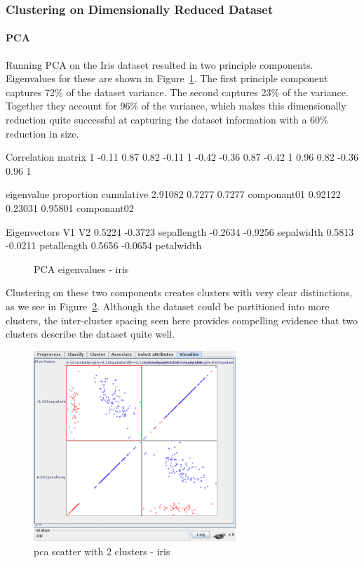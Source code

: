 \documentclass{sig-alternate}
\begin{document}
\subsubsection{Clustering on Dimensionally Reduced Dataset}


\paragraph{PCA}
Running PCA on the Iris dataset resulted in two principle components. Eigenvalues for these are shown in Figure~\ref{pca-iris}. The first principle component captures 72\% of the dataset variance. The second captures 23\% of the variance. Together they account for 96\% of the variance, which makes this dimensionally reduction quite successful at capturing the dataset information with a 60\% reduction in size.


\begin{verbbox}
Correlation matrix
  1     -0.11   0.87   0.82 
 -0.11   1     -0.42  -0.36 
  0.87  -0.42   1      0.96 
  0.82  -0.36   0.96   1    


eigenvalue  proportion  cumulative
2.91082     0.7277      0.7277    componant01
0.92122     0.23031     0.95801   componant02

Eigenvectors
 V1  V2 
 0.5224 -0.3723 sepallength
-0.2634 -0.9256 sepalwidth
 0.5813 -0.0211 petallength
 0.5656 -0.0654 petalwidth
\end{verbbox}

\begin{figure}[!htbp]
    \centering
    \theverbbox
    \caption{PCA eigenvalues - iris\label{pca-iris}}
\end{figure}


Clustering on these two components creates clusters with very clear distinctions, as we see in Figure~\ref{pca-cluster-scatter-iris}. Although the dataset could be partitioned into more clusters, the inter-cluster spacing seen here provides compelling evidence that two clusters describe the dataset quite well.


\begin{figure}[!htbp]
    \centering
    \includegraphics[width=3in]{part2/iris/pca-cluster-scatter.pdf}
    \caption{pca scatter with 2 clusters - iris\label{pca-cluster-scatter-iris}}
\end{figure} 
\end{document}
